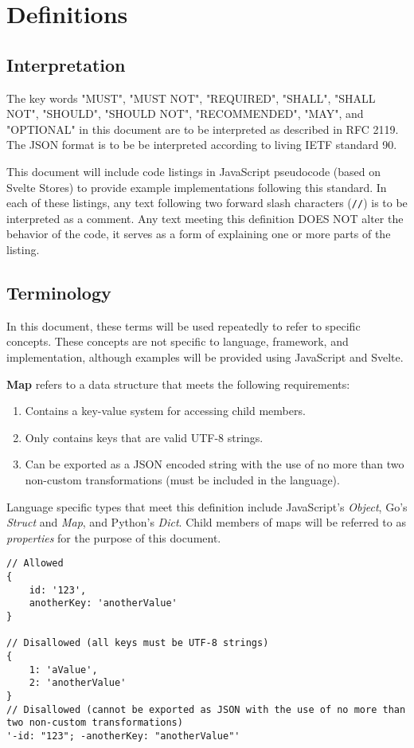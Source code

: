 \documentclass{article}
\begin{document}
\section{Definitions}

\subsection{Interpretation}
The key words "MUST", "MUST NOT", "REQUIRED", "SHALL", "SHALL NOT", "SHOULD", "SHOULD NOT", "RECOMMENDED", "MAY", and "OPTIONAL" in this document are to be interpreted as described in RFC 2119. The JSON format is to be be interpreted according to living IETF standard 90.

This document will include code listings in JavaScript pseudocode (based on Svelte Stores) to provide example implementations following this standard. In each of these listings, any text following two forward slash characters (\verb|//|) is to be interpreted as a comment. Any text meeting this definition DOES NOT alter the behavior of the code, it serves as a form of explaining one or more parts of the listing.

\subsection{Terminology}
In this document, these terms will be used repeatedly to refer to specific concepts. These concepts are not specific to language, framework, and implementation, although examples will be provided using JavaScript and Svelte.

\textbf{Map} refers to a data structure that meets the following requirements:
\begin{enumerate}
    \item Contains a key-value system for accessing child members.
    \item Only contains keys that are valid UTF-8 strings.
    \item Can be exported as a JSON encoded string with the use of no more than two non-custom transformations (must be included in the language).
\end{enumerate}
Language specific types that meet this definition include JavaScript's \emph{Object}, Go's \emph{Struct} and \emph{Map}, and Python's \emph{Dict}. Child members of maps will be referred to as \emph{properties} for the purpose of this document.

\begin{lstlisting}[caption=Maps]
// Allowed 
{
    id: '123',
    anotherKey: 'anotherValue'
}

// Disallowed (all keys must be UTF-8 strings)
{
    1: 'aValue',
    2: 'anotherValue'
}
// Disallowed (cannot be exported as JSON with the use of no more than two non-custom transformations)
'-id: "123"; -anotherKey: "anotherValue"'
\end{lstlisting}
\end{document}
